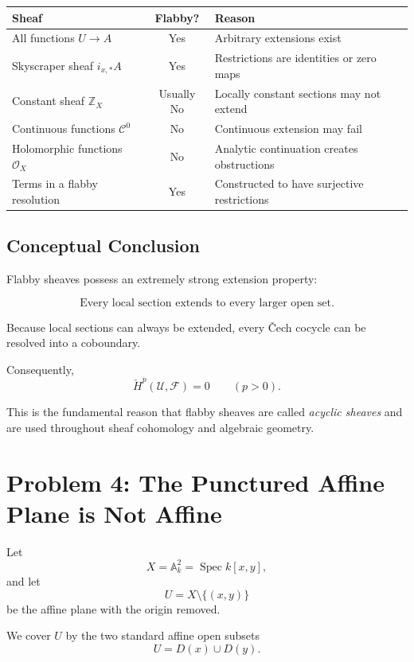 \documentclass[12pt,a4paper]{article}
\theoremstyle{notespace}
\begin{document}
\begin{center}
	\begin{tabular}{|l|c|l|}
		\hline
		Sheaf & Flabby? & Reason \\
		\hline
		All functions $U\to A$ & Yes &
		Arbitrary extensions exist \\
		\hline
		Skyscraper sheaf $i_{x,*}A$ & Yes &
		Restrictions are identities or zero maps \\
		\hline
		Constant sheaf $\mathbb Z_X$ & Usually No &
		Locally constant sections may not extend \\
		\hline
		Continuous functions $\mathcal C^0$ & No &
		Continuous extension may fail \\
		\hline
		Holomorphic functions $\mathcal O_X$ & No &
		Analytic continuation creates obstructions \\
		\hline
		Terms in a flabby resolution & Yes &
		Constructed to have surjective restrictions \\
		\hline
	\end{tabular}
\end{center}

\subsection{Conceptual Conclusion}

Flabby sheaves possess an extremely strong extension property:

\[
\boxed{
	\text{Every local section extends to every larger open set.}
}
\]

Because local sections can always be extended, every \v{C}ech cocycle can be
resolved into a coboundary.

Consequently,
\[
\boxed{
	\check H^p(\mathcal U,\mathcal F)=0
	\qquad (p>0).
}
\]

This is the fundamental reason that flabby sheaves are called
\emph{acyclic sheaves} and are used throughout sheaf cohomology and
algebraic geometry.


\section{Problem 4: The Punctured Affine Plane is Not Affine}

Let
\[
X=\mathbb A_k^2=\operatorname{Spec}k[x,y],
\]
and let
\[
U=X\setminus\{(x,y)\}
\]
be the affine plane with the origin removed.

We cover \(U\) by the two standard affine open subsets
\[
U=D(x)\cup D(y).
\]
\end{document}

